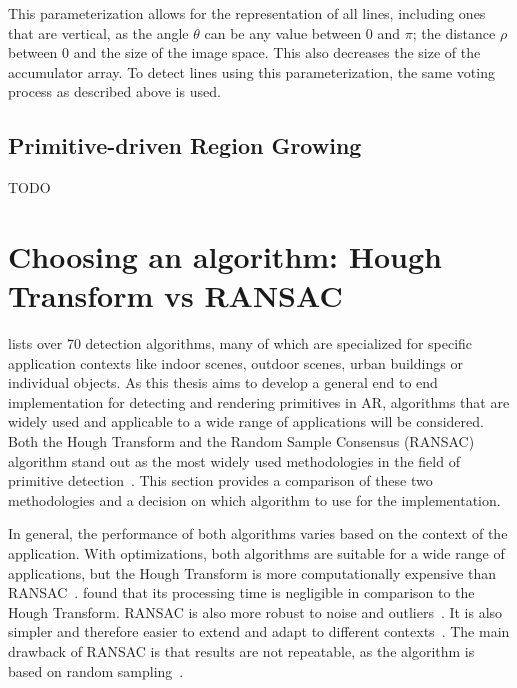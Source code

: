 This parameterization allows for the representation of all lines, including ones that are vertical,
as the angle $\theta$ can be any value between $0$ and $\pi$; the distance $\rho$ between $0$ and the size of the image space.
This also decreases the size of the accumulator array.
To detect lines using this parameterization, the same voting process as described above is used.


\subsection{Primitive-driven Region Growing}
TODO


\section{Choosing an algorithm: Hough Transform vs RANSAC}\label{sec:choosing-an-algorithm}

\cite{kaiser_survey_2019} lists over 70 detection algorithms, many of which are specialized for specific application contexts
like indoor scenes, outdoor scenes, urban buildings or individual objects.
As this thesis aims to develop a general end to end implementation for detecting and rendering primitives in AR,
algorithms that are widely used and applicable to a wide range of applications will be considered.
Both the Hough Transform and the Random Sample Consensus (RANSAC) algorithm stand out as the
most widely used methodologies in the field of primitive detection~\parencite{schnabel_efficient_2007}.
This section provides a comparison of these two methodologies and a decision on which algorithm to use for the implementation.

In general, the performance of both algorithms varies based on the context of the application.
With optimizations, both algorithms are suitable for a wide range of applications, but
the Hough Transform is more computationally expensive than RANSAC~\parencite{kaiser_survey_2019}.
\cite{tarsha-kurdi_hough-transform_2007} found that its processing time is negligible in comparison to the Hough Transform.
RANSAC is also more robust to noise and outliers~\parencite{kaiser_survey_2019}.
It is also simpler and therefore easier to extend and adapt to different contexts~\parencite{tarsha-kurdi_hough-transform_2007, kaiser_survey_2019}.
The main drawback of RANSAC is that results are not repeatable, as the algorithm is based on random sampling~\parencite{kaiser_survey_2019}.


